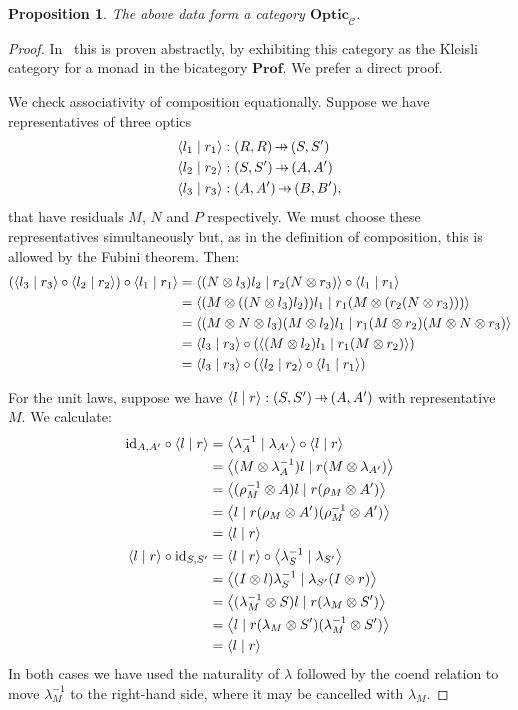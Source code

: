 \documentclass[11pt,letterpaper]{article}
\theoremstyle{plain}
\newtheorem{proposition}[theorem]{Proposition}
\theoremstyle{definition}
\newcommand{\C}{\mathscr{C}}
\newcommand{\Prof}{\mathbf{Prof}}
\newcommand{\Optic}{\mathbf{Optic}}
\newcommand{\id}{\mathrm{id}}
\newcommand{\rep}[2]{{\ensuremath \left\langle #1 \mid #2 \right\rangle}}
\newcommand{\hto}{\ensuremath{\,\mathaccent\shortmid\rightarrow\,}}
\begin{document}
\begin{proposition}\label{prop:optic-is-cat}
  The above data form a category $\Optic_\C$.
\end{proposition}
\begin{proof}
  In~\cite[Section 6]{Doubles} this is proven abstractly, by exhibiting this category as the Kleisli category for a monad in the bicategory $\Prof$. We prefer a direct proof.
  
  We check associativity of composition equationally.  Suppose we have representatives of three optics
\begin{align*}
  \rep{l_1}{r_1} &: (R, R) \hto (S, S') \\
  \rep{l_2}{r_2} &: (S, S') \hto (A, A') \\
  \rep{l_3}{r_3} &: (A, A') \hto (B, B'),
\end{align*}
that have residuals $M$, $N$ and $P$ respectively. We must choose these representatives simultaneously but, as in the definition of composition, this is allowed by the Fubini theorem. Then:
  \begin{align*}
    (\rep{l_3}{r_3} \circ \rep{l_2}{r_2}) \circ \rep{l_1}{r_1}
    &= \rep{(N \otimes l_3)l_2}{r_2(N \otimes r_3)} \circ \rep{l_1}{r_1} \\
    &= \rep{(M \otimes ((N \otimes l_3)l_2))l_1}{r_1(M \otimes (r_2(N \otimes r_3)))} \\
    &= \rep{(M \otimes N \otimes l_3)(M \otimes l_2)l_1}{r_1(M \otimes r_2)(M \otimes N \otimes r_3)} \\
    &= \rep{l_3}{r_3} \circ (\rep{(M \otimes l_2)l_1}{r_1(M \otimes r_2)}) \\
    &= \rep{l_3}{r_3} \circ (\rep{l_2}{r_2} \circ \rep{l_1}{r_1})
  \end{align*}

  For the unit laws, suppose we have $\rep{l}{r} : (S, S') \hto (A, A')$ with representative $M$. We calculate:
  \begin{align*}
    \id_{A, A'} \circ \rep{l}{r}
    &= \rep{\lambda^{-1}_A}{\lambda_{A'}} \circ \rep{l}{r} \\
    &= \rep{(M \otimes \lambda^{-1}_A) l}{r (M \otimes  \lambda_{A'})} \\
    &= \rep{(\rho^{-1}_M \otimes  A) l}{r (\rho_M \otimes A')} \\
    &= \rep{l}{r (\rho_M \otimes A') (\rho^{-1}_M \otimes A')} \\
    &= \rep{l}{r} \\
    \rep{l}{r} \circ \id_{S, S'}
    &= \rep{l}{r} \circ \rep{\lambda^{-1}_S}{\lambda_{S'}}  \\
    &= \rep{(I \otimes l)\lambda^{-1}_S}{\lambda_{S'} (I \otimes r)} \\
    &= \rep{(\lambda^{-1}_M \otimes S)l}{r (\lambda_{M} \otimes S')} \\
    &= \rep{l}{r (\lambda_{M} \otimes S')(\lambda^{-1}_M \otimes S')} \\
    &= \rep{l}{r}
  \end{align*}
  In both cases we have used the naturality of $\lambda$ followed by the coend relation to move $\lambda^{-1}_M$ to the right-hand side, where it may be cancelled with $\lambda_M$.
\end{proof}
\end{document}
